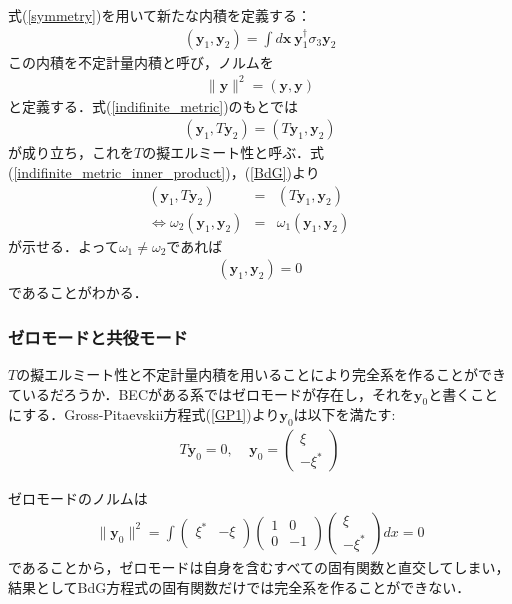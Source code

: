 \documentclass[10.5pt,a4paper]{jreport}
\begin{document}
式(\ref{symmetry})を用いて新たな内積を定義する：
\begin{eqnarray}
  (\bm{y}_1,\bm{y}_2) = \int d\bm{x}\ \bm{y}^\dagger_1\sigma_3\bm{y}_2\label{indifinite_metric}
\end{eqnarray}
この内積を不定計量内積と呼び，ノルムを
\begin{eqnarray}
  \parallel \bm{y} \parallel^2 = (\bm{y},\bm{y})\label{indifinite_metric_norm}
\end{eqnarray}
と定義する．式(\ref{indifinite_metric})のもとでは
\begin{eqnarray}
  (\bm{y}_1,T\bm{y}_2) = (T\bm{y}_1,\bm{y}_2)\label{indifinite_metric_inner_product}
\end{eqnarray}
が成り立ち，これを$T$の擬エルミート性と呼ぶ．式(\ref{indifinite_metric_inner_product})，(\ref{BdG})より
\begin{eqnarray}
  \nonumber
  (\bm{y}_1,T\bm{y}_2) &=& (T\bm{y}_1,\bm{y}_2)\\
  \Longleftrightarrow \omega_2(\bm{y}_1,\bm{y}_2) &=& \omega_1(\bm{y}_1,\bm{y}_2)\ \ \ \ \ \ \ 
\end{eqnarray}
が示せる．よって$\omega_1 \neq \omega_2$であれば
\begin{eqnarray}
  (\bm{y}_1,\bm{y}_2) = 0
\end{eqnarray}
であることがわかる．
\subsubsection{ゼロモードと共役モード}
$T$の擬エルミート性と不定計量内積を用いることにより完全系を作ることができているだろうか．BECがある系ではゼロモードが存在し，それを$\bm{y}_0$と書くことにする．Gross-Pitaevskii方程式(\ref{GP1})より$\bm{y}_0$は以下を満たす:
\begin{eqnarray}
  T\bm{y}_0 = 0,\ \ \ \ \ \bm{y}_0 = 
  \begin{pmatrix}
    \xi \\
    -\xi^*
  \end{pmatrix}
\end{eqnarray}

ゼロモードのノルムは
\begin{eqnarray}
  \parallel \bm{y}_0 \parallel^2 = \int
  \begin{pmatrix}
    \xi^* & -\xi \\
  \end{pmatrix}
  \begin{pmatrix}
    1 & 0\\
    0 & -1
  \end{pmatrix}
  \begin{pmatrix}
    \xi \\
    -\xi^*
  \end{pmatrix}dx
  =0
\end{eqnarray}
であることから，ゼロモードは自身を含むすべての固有関数と直交してしまい，結果としてBdG方程式の固有関数だけでは完全系を作ることができない．
\end{document}
